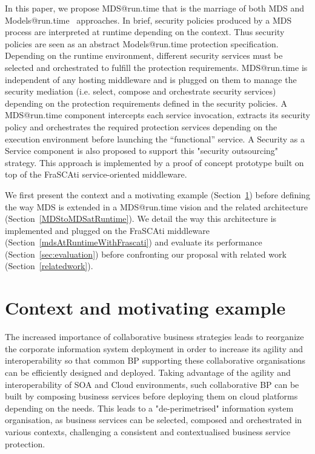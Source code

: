 \documentclass[runningheads,a4paper]{llncs}
\begin{document}
In this paper, we propose MDS@run.time that is the marriage of both MDS and Models@run.time~\cite{blair2009models} approaches.
In brief, security policies produced by a MDS process are interpreted at runtime depending on the context.
Thus security policies are seen as an abstract Models@run.time protection specification.
Depending on the runtime environment, different security services must be selected and orchestrated to fulfill the protection requirements.
MDS@run.time is independent of any hosting middleware and
is plugged on them to manage the security mediation (i.e. select, compose and orchestrate security services) depending on the protection requirements defined in the security policies.
A MDS@run.time component intercepts each service invocation, extracts its security policy and orchestrates the required protection services depending on the execution environment before launching the “functional” service.
A Security as a Service component is also proposed to support this "security outsourcing" strategy. 
This approach is implemented by a proof of concept prototype built on top of the FraSCAti service-oriented middleware.


We first present the context and a motivating example (Section~\ref{contextAndMotivation}) before defining the way MDS is extended in a MDS@run.time vision and the related architecture (Section~\ref{MDStoMDSatRuntime}). We detail the way this architecture is implemented and plugged on the FraSCAti middleware (Section~\ref{mdsAtRuntimeWithFrascati}) and evaluate its performance (Section~\ref{sec:evaluation}) before confronting our proposal with related work (Section~\ref{relatedwork}).

\section{Context and motivating example}
\label{contextAndMotivation}

The increased importance of collaborative business strategies leads to reorganize the corporate information system deployment in order to increase its agility and interoperability so that common BP supporting these collaborative organisations can be efficiently designed and deployed. Taking advantage of the agility and interoperability of SOA and Cloud environments, such collaborative BP can be built by composing business services before deploying them on cloud platforms depending on the needs. This leads to a "de-perimetrised" information system organisation, as business services can be selected, composed and orchestrated in various contexts, challenging a consistent and contextualised business service protection.
\end{document}
